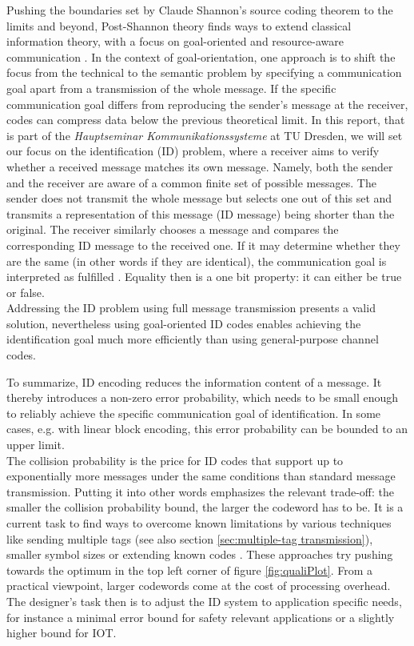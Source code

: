 \documentclass[english,BCOR=4mm,cdfont=false]{tudscrreprt} %
\begin{document}
Pushing the boundaries set by Claude Shannon’s source coding theorem \cite{The_mathematical_theory_of_communication} to the limits and beyond, Post-Shannon theory finds ways to extend classical information theory, with a focus on goal-oriented and resource-aware communication \cite{strinati2021beyondShannon}. In the context of goal-orientation, one approach is to shift the focus from the technical to the semantic problem by specifying a communication goal apart from a transmission of the whole message. 
If the specific communication goal differs from reproducing the sender's message at the receiver, codes can compress data below the previous theoretical limit. In this report, that is part of the \textit{Hauptseminar Kommunikationssysteme} at TU Dresden, we will set our focus on the identification (ID) problem, where a receiver aims to verify whether a received message matches its own message. 
Namely, both the sender and the receiver are aware of a common finite set of possible messages. The sender does not transmit the whole message but selects one out of this set and transmits a representation of this message (ID message) being shorter than the original. The receiver similarly chooses a message and compares the corresponding ID message to the received one. If it may determine whether they are the same (in other words if they are identical), the communication goal is interpreted as fulfilled \cite{Codes_for_ID_Tutorial}. Equality then is a one bit property: it can either be true or false. \\
Addressing the ID problem using full message transmission presents a valid solution, nevertheless using goal-oriented ID codes enables achieving the identification goal much more efficiently than using general-purpose channel codes.

To summarize, ID encoding reduces the information content of a message. It thereby introduces a non-zero error probability, which needs to be small enough to reliably achieve the specific communication goal of identification. In some cases, e.g. with linear block encoding, this error probability can be bounded to an upper limit. \\
The collision probability is the price for ID codes that support up to exponentially more messages under the same conditions than standard message transmission. 
Putting it into other words emphasizes the relevant trade-off: the smaller the collision probability bound, the larger the codeword has to be. It is a current task to find ways to overcome known limitations by various techniques like sending multiple tags (see also section \ref{sec:multiple-tag transmission}), smaller symbol sizes or extending known codes \cite{deppe_ferrara_2020}. These approaches try pushing towards the optimum in the top left corner of figure \ref{fig:qualiPlot}. From a practical viewpoint, larger codewords come at the cost of processing overhead. The designer's task then is to adjust the ID system to application specific needs, for instance a minimal error bound for safety relevant applications or a slightly higher bound for IOT. 
\end{document}
